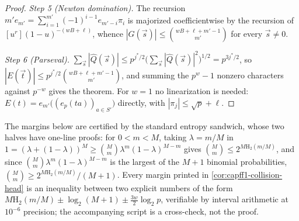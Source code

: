 \documentclass[11pt]{article}
\theoremstyle{definition}
\theoremstyle{remark}
\newcommand{\Hb}{\mathrm{H}_2}
\begin{document}
\begin{proof}
\emph{Step 5 (Newton domination).}  The recursion $m'e_{m'}=\sum_{i=1}^{m'}(-1)^{i-1}e_{m'-i}\pi_i$ is majorized coefficientwise by the recursion of $[u^r](1-u)^{-(wB+\ell)}$, whence $|G(\vec s)|\le\binom{wB+\ell+m'-1}{m'}$ for every $\vec s\ne0$.

\emph{Step 6 (Parseval).}  $\sum_{\vec s}|\widehat Q(\vec s)|\le p^{j^*/2}\bigl(\sum_{\vec s}|\widehat Q(\vec s)|^2\bigr)^{1/2}=p^{3j^*/2}$, so $|E(\vec t)|\le p^{j^*/2}\binom{wB+\ell+m'-1}{m'}$, and summing the $p^w-1$ nonzero characters against $p^{-w}$ gives the theorem.  For $w=1$ no linearization is needed: $E(t)=e_{m'}\bigl((e_p(ta))_{a\in S'}\bigr)$ directly, with $|\pi_j|\le\sqrt p+\ell$.
\end{proof}

The margins below are certified by the standard entropy sandwich, whose two halves have one-line proofs: for $0<m<M$, taking $\lambda=m/M$ in $1=(\lambda+(1-\lambda))^M\ge\binom Mm\lambda^m(1-\lambda)^{M-m}$ gives $\binom Mm\le2^{M\Hb(m/M)}$, and since $\binom Mm\lambda^m(1-\lambda)^{M-m}$ is the largest of the $M+1$ binomial probabilities, $\binom Mm\ge2^{M\Hb(m/M)}/(M+1)$.  Every margin printed in \cref{cor:capff1-collision-head} is an inequality between two explicit numbers of the form $M\Hb(m/M)\pm\log_2(M+1)\pm\tfrac{3w}2\log_2p$, verifiable by interval arithmetic at $10^{-6}$ precision; the accompanying script is a cross-check, not the proof.
\end{document}
